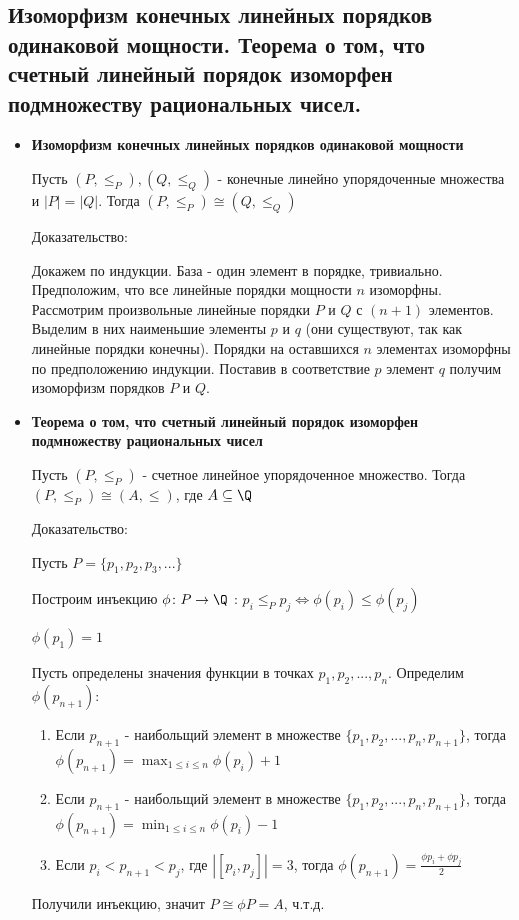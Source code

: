 \subsection{Изоморфизм конечных линейных порядков одинаковой мощности. Теорема о том, что счетный линейный порядок изоморфен подмножеству рациональных чисел.}
\begin{itemize}
	\item \textbf{Изоморфизм конечных линейных порядков одинаковой мощности}
	
	Пусть $(P, \leqslant_P), (Q, \leqslant_Q)$ - конечные линейно упорядоченные множества и $|P| = |Q|$. Тогда $(P, \leqslant_P) \cong (Q, \leqslant_Q)$ 
	
	Доказательство:
	
	Докажем по индукции. База - один элемент в порядке, тривиально. Предположим, что все линейные порядки мощности $n$ изоморфны. Рассмотрим произвольные линейные порядки $P$ и $Q$ с $(n+1)$ элементов. Выделим в них наименьшие элементы $p$ и $q$ (они существуют, так как линейные порядки конечны). Порядки на оставшихся $n$ элементах изоморфны по предположению индукции. Поставив в соответствие $p$ элемент $q$ получим изоморфизм порядков $P$ и $Q$.
	
	\item \textbf{Теорема о том, что счетный линейный порядок изоморфен подмножеству рациональных чисел}
	
	Пусть $(P, \leqslant_P)$ - счетное линейное упорядоченное множество. Тогда $(P, \leqslant_P) \cong (A, \leqslant)$, где $A \subseteq \Q$
	
	Доказательство:
	
	Пусть $P = \{p_1, p_2, p_3, ...\}$
	
	Построим инъекцию $\phi \colon P \to \Q$ : $p_i \leqslant_P p_j \Leftrightarrow \phi(p_i) \leqslant \phi(p_j)$
	
	$\phi(p_1) = 1$
	
	Пусть определены значения функции в точках $p_1, p_2, ..., p_n$. Определим $\phi(p_{n+1})$:
	
	\begin{enumerate}
		\item Если $p_{n+1}$ - наибольщий элемент в множестве $\{p_1, p_2, ..., p_n, p_{n+1}\}$, тогда $\phi(p_{n+1}) = \max_{1 \leqslant i \leqslant n}\phi(p_i) + 1$
		\item Если $p_{n+1}$ - наибольщий элемент в множестве $\{p_1, p_2, ..., p_n, p_{n+1}\}$, тогда $\phi(p_{n+1}) = \min_{1 \leqslant i \leqslant n}\phi(p_i) - 1$
		\item Если $p_i < p_{n+1} < p_j$, где $|[p_i, p_j]| = 3$, тогда $\phi(p_{n+1}) = \frac{\phi{p_i} + \phi{p_j}}{2}$
	\end{enumerate}
	
	Получили инъекцию, значит $P \cong \phi{P} = A$, ч.т.д.
	
\end{itemize}